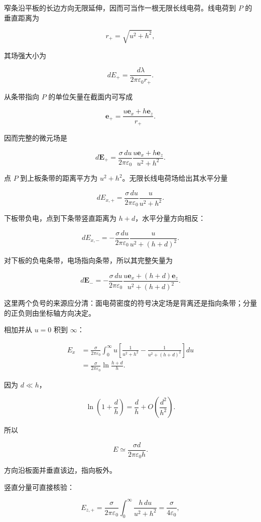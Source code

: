 \documentclass[12pt,a4paper,UTF8]{ctexart}
\begin{document}
窄条沿平板的长边方向无限延伸，因而可当作一根无限长线电荷。线电荷到 \(P\)
的垂直距离为

\[
r_+=\sqrt{u^2+h^2},
\]

其场强大小为

\[
dE_+=\frac{d\lambda}{2\pi\varepsilon_0r_+}.
\]

从条带指向 \(P\) 的单位矢量在截面内可写成

\[
\boldsymbol e_+
=\frac{u\boldsymbol e_x+h\boldsymbol e_z}{r_+}.
\]

因而完整的微元场是

\[
d\boldsymbol E_+
=\frac{\sigma\,du}{2\pi\varepsilon_0}
\frac{u\boldsymbol e_x+h\boldsymbol e_z}{u^2+h^2}.
\]

点 \(P\) 到上板条带的距离平方为
\(u^2+h^2\)。无限长线电荷场给出其水平分量

\[
dE_{x,+}
=\frac{\sigma\,du}{2\pi\varepsilon_0}
\frac{u}{u^2+h^2}.
\tag{2}
\]

下板带负电，点到下条带竖直距离为 \(h+d\)，水平分量方向相反：

\[
dE_{x,-}
=-\frac{\sigma\,du}{2\pi\varepsilon_0}
\frac{u}{u^2+(h+d)^2}.
\tag{3}
\]

对下板的负电条带，电场指向条带，所以其完整矢量为

\[
d\boldsymbol E_-
=-\frac{\sigma\,du}{2\pi\varepsilon_0}
\frac{u\boldsymbol e_x+(h+d)\boldsymbol e_z}
{u^2+(h+d)^2}.
\]

这里两个负号的来源应分清：面电荷密度的符号决定场是背离还是指向条带；分量的正负则由坐标轴方向决定。

相加并从 \(u=0\) 积到 \(\infty\)：

\[
\begin{aligned}
E_x
&=\frac{\sigma}{2\pi\varepsilon_0}
\int_0^\infty
u\left[
\frac1{u^2+h^2}
-\frac1{u^2+(h+d)^2}
\right]du\\
&=\frac{\sigma}{2\pi\varepsilon_0}
\ln\frac{h+d}{h}.
\end{aligned}
\tag{4}
\]

因为 \(d\ll h\)，

\[
\ln\left(1+\frac dh\right)
=\frac dh+O\!\left(\frac{d^2}{h^2}\right).
\tag{5}
\]

所以

\[
\boxed{
E\simeq\frac{\sigma d}{2\pi\varepsilon_0h}
}.
\tag{6}
\]

方向沿板面并垂直该边，指向板外。

竖直分量可直接核验：

\[
E_{z,+}
=\frac{\sigma}{2\pi\varepsilon_0}
\int_0^\infty\frac{h\,du}{u^2+h^2}
=\frac{\sigma}{4\varepsilon_0},
\tag{7}
\]
\end{document}
